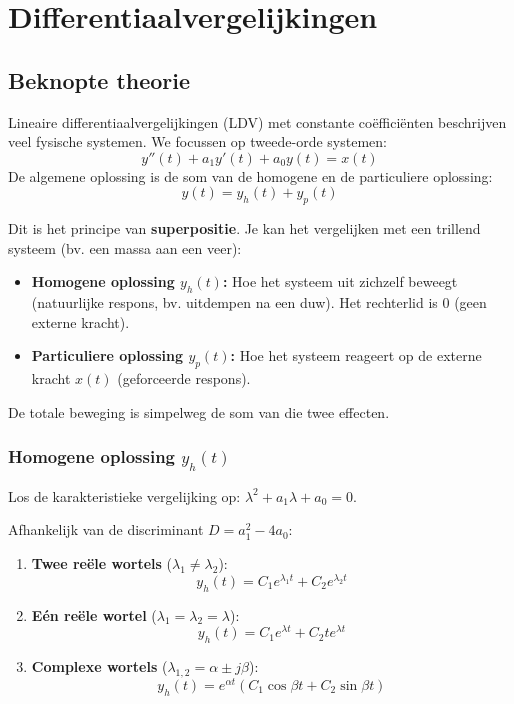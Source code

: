 \newpage
\section{Differentiaalvergelijkingen}

\subsection{Beknopte theorie}

Lineaire differentiaalvergelijkingen (LDV) met constante coëfficiënten 
beschrijven veel fysische systemen. We focussen op tweede-orde systemen:
\[ y''(t) + a_1 y'(t) + a_0 y(t) = x(t) \]
De algemene oplossing is de som van de homogene en de particuliere oplossing:
\[ y(t) = y_h(t) + y_p(t) \]

\begin{conceptbox}
Dit is het principe van \textbf{superpositie}. Je kan het vergelijken met een trillend systeem (bv. een massa aan een veer):
\begin{itemize}
    \item \textbf{Homogene oplossing $y_h(t)$:} Hoe het systeem uit zichzelf beweegt (natuurlijke respons, bv. uitdempen na een duw). Het rechterlid is 0 (geen externe kracht).
    \item \textbf{Particuliere oplossing $y_p(t)$:} Hoe het systeem reageert op de externe kracht $x(t)$ (geforceerde respons).
\end{itemize}
De totale beweging is simpelweg de som van die twee effecten.
\end{conceptbox}

\subsubsection{Homogene oplossing $y_h(t)$}
Los de karakteristieke vergelijking op: $\lambda^2 + a_1\lambda + a_0 = 0$.

\begin{theorie}
Afhankelijk van de discriminant $D = a_1^2 - 4a_0$:
\begin{enumerate}
    \item \textbf{Twee reële wortels} ($\lambda_1 \neq \lambda_2$):
    \[ y_h(t) = C_1 e^{\lambda_1 t} + C_2 e^{\lambda_2 t} \]
    
    \item \textbf{Eén reële wortel} ($\lambda_1 = \lambda_2 = \lambda$):
    \[ y_h(t) = C_1 e^{\lambda t} + C_2 t e^{\lambda t} \]
    
    \item \textbf{Complexe wortels} ($\lambda_{1,2} = \alpha \pm j\beta$):
    \[ y_h(t) = e^{\alpha t} (C_1 \cos \beta t + C_2 \sin \beta t) \]
\end{enumerate}
\end{theorie}

